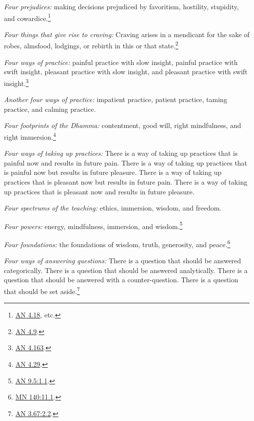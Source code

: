 \documentclass[12pt,openany]{book}%
\begin{document}
\emph{Four prejudices:} making decisions prejudiced by favoritism, hostility, stupidity, and cowardice.\footnote{\href{https://suttacentral.net/an4.18/en/sujato}{AN 4.18}, etc. } 

\emph{Four things that give rise to craving:} Craving arises in a mendicant for the sake of robes, almsfood, lodgings, or rebirth in this or that state.\footnote{\href{https://suttacentral.net/an4.9/en/sujato}{AN 4.9}. } 

\emph{Four ways of practice:} painful practice with slow insight, painful practice with swift insight, pleasant practice with slow insight, and pleasant practice with swift insight.\footnote{\href{https://suttacentral.net/an4.163/en/sujato}{AN 4.163}. } 

\emph{Another four ways of practice:} impatient practice, patient practice, taming practice, and calming practice. 

\emph{Four footprints of the Dhamma:} contentment, good will, right mindfulness, and right immersion.\footnote{\href{https://suttacentral.net/an4.29/en/sujato}{AN 4.29}. } 

\emph{Four ways of taking up practices:} There is a way of taking up practices that is painful now and results in future pain. There is a way of taking up practices that is painful now but results in future pleasure. There is a way of taking up practices that is pleasant now but results in future pain. There is a way of taking up practices that is pleasant now and results in future pleasure. 

\emph{Four spectrums of the teaching:} ethics, immersion, wisdom, and freedom. 

\emph{Four powers:} energy, mindfulness, immersion, and wisdom.\footnote{\href{https://suttacentral.net/an9.5/en/sujato\#1.1}{AN 9.5:1.1}. } 

\emph{Four foundations:} the foundations of wisdom, truth, generosity, and peace.\footnote{\href{https://suttacentral.net/mn140/en/sujato\#11.1}{MN 140:11.1}. } 

\emph{Four ways of answering questions:} There is a question that should be answered categorically. There is a question that should be answered analytically. There is a question that should be answered with a counter-question. There is a question that should be set aside.\footnote{\href{https://suttacentral.net/an3.67/en/sujato\#2.2}{AN 3.67:2.2}. } 
\end{document}
